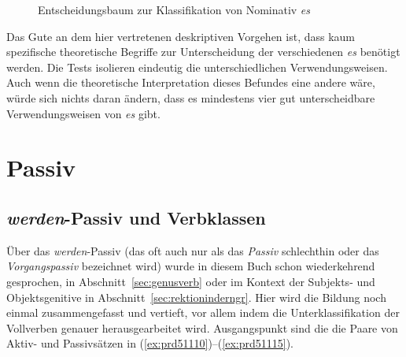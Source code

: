 \begin{figure}
  \caption{Entscheidungsbaum zur Klassifikation von Nominativ \textit{es}}
  \label{fig:escat}
\end{figure}

Das Gute an dem hier vertretenen deskriptiven Vorgehen ist, dass kaum spezifische theoretische Begriffe zur Unterscheidung der verschiedenen \textit{es} benötigt werden.
Die Tests isolieren eindeutig die unterschiedlichen Verwendungsweisen.
Auch wenn die theoretische Interpretation dieses Befundes eine andere wäre, würde sich nichts daran ändern, dass es mindestens vier gut unterscheidbare Verwendungsweisen von \textit{es} gibt.

\section{Passiv}

\label{sec:passiv}

\subsection{\textit{werden}-Passiv und Verbklassen}

\label{sec:werdenpassiv}


Über das \textit{werden}-Passiv (das oft auch nur als das \textit{Passiv} schlechthin oder das \textit{Vorgangspassiv} bezeichnet wird) wurde in diesem Buch schon wiederkehrend gesprochen, \zB in Abschnitt~\ref{sec:genusverb} oder im Kontext der Subjekts- und Objektsgenitive in Abschnitt~\ref{sec:rektioninderngr}.
Hier wird die Bildung noch einmal zusammengefasst und vertieft, vor allem indem die Unterklassifikation der Vollverben genauer herausgearbeitet wird.
Ausgangspunkt sind die die Paare von Aktiv- und Passivsätzen in (\ref{ex:prd51110})--(\ref{ex:prd51115}).

